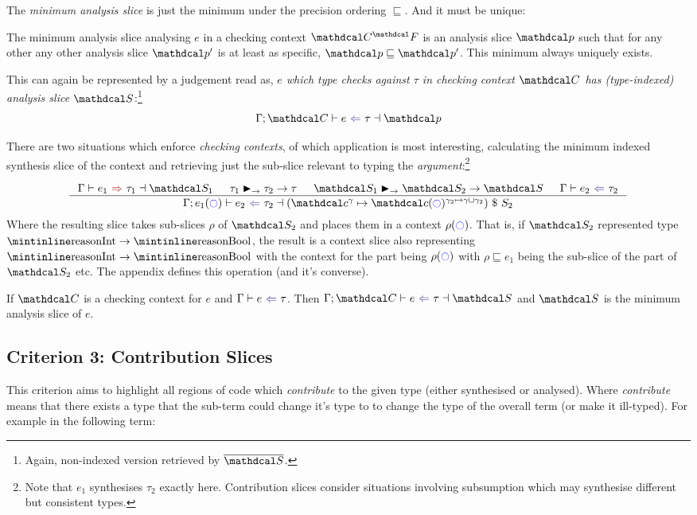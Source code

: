 The \textit{minimum analysis slice} is just the minimum under the precision ordering $\sqsubseteq$. And it must be unique:

\begin{conjecture}\label{conj:AnalysisSliceUniqueness}
The minimum analysis slice analysing $e$ in a checking context $\C^\F$ is an analysis slice $\p$ such that for any other any other analysis slice $\p'$ is at least as specific, $\p \sqsubseteq \p'$. This minimum always uniquely exists.
\end{conjecture}

This can again be represented by a judgement read as, \textit{$e$ which type checks against $\tau$ in checking context $\C$ has (type-indexed) analysis slice $\S$}:\footnote{Again, non-indexed version retrieved by $\overline{\S}$.}
\[\analysisslice{\C}{e}{\tau}{\p}\]

There are two situations which enforce \textit{checking contexts}, of which application is most interesting, calculating the minimum indexed synthesis slice of the context and retrieving just the sub-slice relevant to typing the \textit{argument}:\footnote{Note that $e_1$ synthesises $\tau_2$ exactly here. Contribution slices consider situations involving subsumption which may synthesise different but consistent types.}

\[\inference{\synthesisslice{e_1}{\tau_1}{\S_1} & \tau_1 \funmatch \tau_2 \to \tau & \S_1 \funmatch \S_2 \to \S & \analysis{e_2}{\tau_2}}{\analysisslice{e_1(\cmark)}{e_2}{\tau_2}{(\Cs^\gamma \mapsto \Cs(\cmark)^{\gamma_2 \mapsto \gamma \sqcup \gamma_2})\ \$\ S_2}}\]
Where the resulting slice takes sub-slices $\rho$ of $\S_2$ and places them in a context $\rho(\cmark)$. That is, if $\S_2$ represented type $\code{Int} \to \code{Bool}$, the result is a context slice also representing $\code{Int} \to \code{Bool}$ with the context for the  part being $\rho(\cmark)$ with $\rho \sqsubseteq e_1$ being the sub-slice of the  part of $\S_2$ etc. The appendix defines this operation (and it's converse).

\begin{conjecture}[Correctness]\label{conj:AnalysisSliceCorrectness}
If $\C$ is a checking context for $e$ and $\analysis{e}{\tau}$. Then $\analysisslice{\C}{e}{\tau}{\S}$ and $\S$ is the minimum analysis slice of $e$.
\end{conjecture}

\subsection{Criterion 3: Contribution Slices}
\label{sec:ContributionSlices}
This criterion aims to highlight all regions of code which \textit{contribute} to the given type (either synthesised or analysed). Where \textit{contribute} means that there exists a type that the sub-term could change it's type to to change the type of the overall term (or make it ill-typed). For example in the following term:


